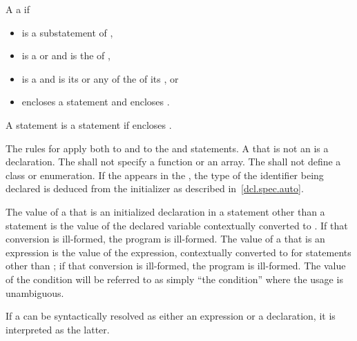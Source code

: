 \pnum
{}%
A   
a   if
\begin{itemize}
\item
   is a substatement of ,
\item
   is a  or
   and
   is the  of ,
\item
   is a  and 
  is its  or
  any of the  of
  its , or
\item
   encloses a statement  and  encloses .
\end{itemize}
%
A statement  is
a statement  if
 encloses .

\pnum
{}%
The rules for  apply both to
 and to the  and 
statements.
A  that is not an  is a
declaration.
The  shall not
specify a function or an array. The  shall not
define a class or enumeration. If the   appears in
the ,
the type of the identifier being declared is deduced from the initializer as described in~\ref{dcl.spec.auto}.

\pnum
The value of a  that is an initialized declaration
in a statement other than a  statement is the value of the
declared variable
contextually converted to .
If that
conversion is ill-formed, the program is ill-formed.
The value of a
 that is an expression is the value of the
expression, contextually converted to 
for statements other
than ;
if that conversion is ill-formed, the program is
ill-formed. The value of the condition will be referred to as simply
``the condition'' where the usage is unambiguous.

\pnum
If a  can be syntactically resolved
as either an expression or a declaration,
it is interpreted as the latter.

